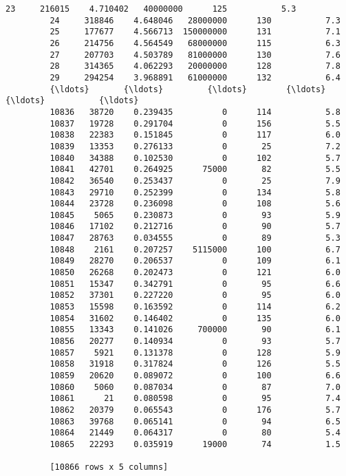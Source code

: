 \documentclass[11pt]{article}
\begin{document}
\begin{Verbatim}[commandchars=\\\{\}]
         23     216015    4.710402   40000000      125           5.3
         24     318846    4.648046   28000000      130           7.3
         25     177677    4.566713  150000000      131           7.1
         26     214756    4.564549   68000000      115           6.3
         27     207703    4.503789   81000000      130           7.6
         28     314365    4.062293   20000000      128           7.8
         29     294254    3.968891   61000000      132           6.4
         {\ldots}       {\ldots}         {\ldots}        {\ldots}      {\ldots}           {\ldots}
         10836   38720    0.239435          0      114           5.8
         10837   19728    0.291704          0      156           5.5
         10838   22383    0.151845          0      117           6.0
         10839   13353    0.276133          0       25           7.2
         10840   34388    0.102530          0      102           5.7
         10841   42701    0.264925      75000       82           5.5
         10842   36540    0.253437          0       25           7.9
         10843   29710    0.252399          0      134           5.8
         10844   23728    0.236098          0      108           5.6
         10845    5065    0.230873          0       93           5.9
         10846   17102    0.212716          0       90           5.7
         10847   28763    0.034555          0       89           5.3
         10848    2161    0.207257    5115000      100           6.7
         10849   28270    0.206537          0      109           6.1
         10850   26268    0.202473          0      121           6.0
         10851   15347    0.342791          0       95           6.6
         10852   37301    0.227220          0       95           6.0
         10853   15598    0.163592          0      114           6.2
         10854   31602    0.146402          0      135           6.0
         10855   13343    0.141026     700000       90           6.1
         10856   20277    0.140934          0       93           5.7
         10857    5921    0.131378          0      128           5.9
         10858   31918    0.317824          0      126           5.5
         10859   20620    0.089072          0      100           6.6
         10860    5060    0.087034          0       87           7.0
         10861      21    0.080598          0       95           7.4
         10862   20379    0.065543          0      176           5.7
         10863   39768    0.065141          0       94           6.5
         10864   21449    0.064317          0       80           5.4
         10865   22293    0.035919      19000       74           1.5
         
         [10866 rows x 5 columns]
\end{Verbatim}
            
\end{document}
